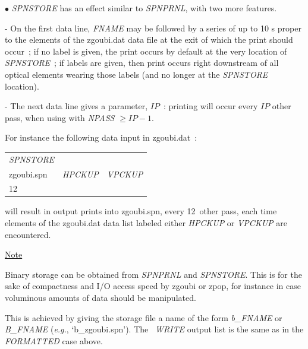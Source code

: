 \medskip

\noindent  $\bullet$   \textsl{SPNSTORE} has an effect similar to \textsl{SPNPRNL}, with two more features. 

- On the first data line, \textsl{FNAME} may be followed 
by a series of up to 10 \LABEL s proper to the elements of the zgoubi.dat data 
file at the exit of which the print should occur~; if no label is given, 
the print occurs by default at the very location of \textsl{SPNSTORE}~; 
if  labels are given, then print occurs right downstream of all optical elements wearing those labels
 (and no longer at the \textsl{SPNSTORE} location). 

- The next data line 
gives a parameter, $IP$~: printing will occur every $IP$ other pass, when 
using \REBELOTE{} with \textsl{NPASS} $ \geq IP-1$. 

For instance the following data input in zgoubi.dat~: 

\medskip

{\renewcommand{\arraystretch}{1}
\begin{tabular}{lll}
	\textsl{SPNSTORE} &  &   \\
	zgoubi.spn \index{zgoubi.fai} & \textsl{HPCKUP} & \textsl{VPCKUP}  \\
	12 &  & 
\end{tabular}}

\medskip

\noindent will result in output prints into zgoubi.spn, every 12~other 
pass, each time elements of the zgoubi.dat  data list labeled either \textsl{HPCKUP}
or \textsl{VPCKUP} are encountered.

\medskip

\noindent\underline{Note}

\medskip

\noindent Binary storage can be obtained from \textsl{SPNPRNL} and \textsl{SPNSTORE}. This is for 
the sake of compactness and I/O access speed by zgoubi  or zpop, for instance  in case  voluminous amounts of 
data should be manipulated. 

\noindent This is achieved by giving the storage file a name of the form \textsl{b\_FNAME} 
or \textsl{B\_FNAME}  (\emph{e.g.}, `b\_zgoubi.spn'). The \FORTRAN\ \textsl{WRITE} output list 
is the same as in the \textsl{FORMATTED} case above.  







